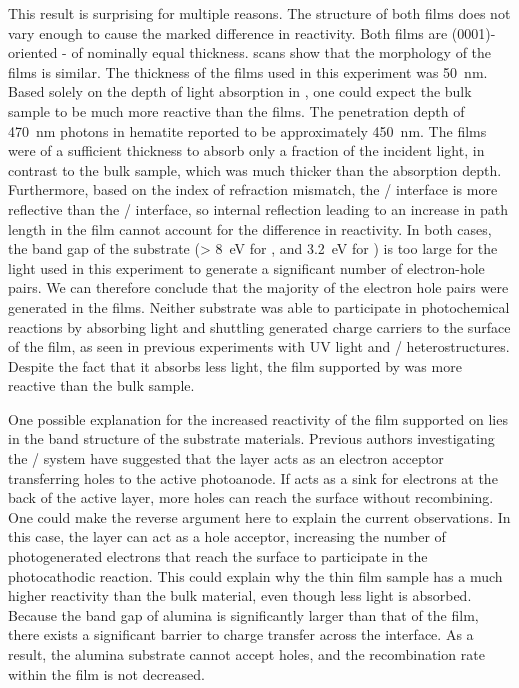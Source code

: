 This result is surprising for multiple reasons.  The structure of both films does not vary enough to cause the marked difference in reactivity. Both films are (0001)-oriented \textalpha- of nominally equal thickness.   scans show that the morphology of the films is similar. The thickness of the films used in this experiment was \texttildelow\SI{50}{\nano\meter}. Based solely on the depth of light absorption in , one could expect the bulk sample to be much more reactive than the films.  The penetration depth of \SI{470}{\nano\meter} photons in hematite reported to be approximately \SI{450}{\nano\meter}.\cite{Marusak:1980gc}  The films were of a sufficient thickness to absorb only a fraction of the incident light, in contrast to the bulk sample, which was much thicker than the absorption depth. Furthermore, based on the index of refraction mismatch, the / interface is more reflective than the / interface, so internal reflection leading to an increase in path length in the film cannot account for the difference in reactivity.  In both cases, the band gap of the substrate (> \SI{8}{\electronvolt} for ,\cite{French:1998wj} and \SI{3.2}{\electronvolt}  for \cite{Cardona:1965vw}) is too large for the light used in this experiment to generate a significant number of electron-hole pairs.  We can therefore conclude that the majority of the electron hole pairs were generated in the films. Neither substrate was able to participate in photochemical reactions by absorbing light and shuttling generated charge carriers to the surface of the film, as seen in previous experiments with UV light and / heterostructures.\cite{Burbure:2010ti,Burbure:2010go}  Despite the fact that it absorbs less light, the film supported by  was more reactive than the bulk sample.

One possible explanation for the increased reactivity of the film supported on  lies in the band structure of the substrate materials. Previous authors investigating the / system have suggested that the  layer acts as an electron acceptor transferring holes to the active  photoanode.\cite{Wang:2007fp} If  acts as a sink for electrons at the back of the active layer, more holes can reach the surface without recombining.  One could make the reverse argument here to explain the current observations.  In this case, the  layer can act as a hole acceptor, increasing the number of photogenerated electrons that reach the  surface to participate in the photocathodic reaction.  This could explain why the thin film sample has a much higher reactivity than the bulk material, even though less light is absorbed.  Because the band gap of alumina is significantly larger than that of the  film, there exists a significant barrier to charge transfer across the interface.  As a result, the alumina substrate cannot accept holes, and the recombination rate within the film is not decreased.

